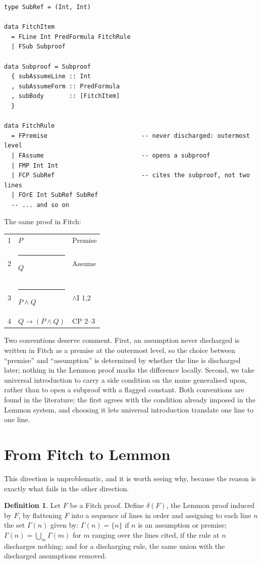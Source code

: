 \documentclass[11pt]{article}
\makeatletter
\theoremstyle{plain}
\theoremstyle{definition}
\newtheorem{definition}[theorem]{Definition}
\theoremstyle{remark}
\newcommand{\fbar}{\rule[-0.7ex]{0.4pt}{2.6ex}\hspace{0.7em}}
\newenvironment{fitchproof}
  {\begin{center}\begin{tabular}{@{}r@{\hspace{1em}}l@{\hspace{2.5em}}l@{}}}
  {\end{tabular}\end{center}}
\makeatother
\begin{document}
\begin{lstlisting}
type SubRef = (Int, Int)

data FitchItem
  = FLine Int PredFormula FitchRule
  | FSub Subproof

data Subproof = Subproof
  { subAssumeLine :: Int
  , subAssumeForm :: PredFormula
  , subBody       :: [FitchItem]
  }

data FitchRule
  = FPremise                          -- never discharged: outermost level
  | FAssume                           -- opens a subproof
  | FMP Int Int
  | FCP SubRef                        -- cites the subproof, not two lines
  | FOrE Int SubRef SubRef
  -- ... and so on
\end{lstlisting}

The same proof in Fitch:

\begin{fitchproof}
1 &                 $P$                  & Premise \\
2 & \fbar           $Q$                  & Assume \\
3 & \fbar           $P \wedge Q$         & $\wedge$I 1,2 \\
4 &                 $Q \to (P \wedge Q)$ & CP 2--3 \\
\end{fitchproof}

Two conventions deserve comment. First, an assumption never discharged is
written in Fitch as a premise at the outermost level, so the choice between
``premise'' and ``assumption'' is determined by whether the line is discharged
later; nothing in the Lemmon proof marks the difference locally. Second, we
take universal introduction to carry a side condition on the name generalised
upon, rather than to open a subproof with a flagged constant. Both conventions
are found in the literature; the first agrees with the condition already
imposed in the Lemmon system, and choosing it lets universal introduction
translate one line to one line.

\section{From Fitch to Lemmon}\label{sec:fitch-to-lemmon}

This direction is unproblematic, and it is worth seeing why, because the
reason is exactly what fails in the other direction.

\begin{definition}
Let $F$ be a Fitch proof. Define $\delta(F)$, the Lemmon proof induced by $F$,
by flattening $F$ into a sequence of lines in order and assigning to each line
$n$ the set $\Gamma(n)$ given by: $\Gamma(n) = \{n\}$ if $n$ is an assumption
or premise; $\Gamma(n) = \bigcup_{m} \Gamma(m)$ for $m$ ranging over the lines
cited, if the rule at $n$ discharges nothing; and for a discharging rule,
the same union with the discharged assumptions removed.
\end{definition}
\end{document}
